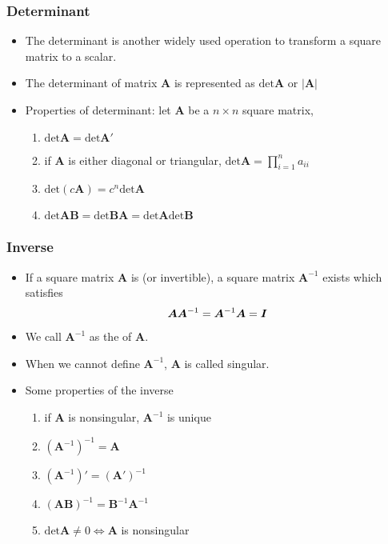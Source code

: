 \documentclass[pdflatex, 12pt]{beamer}
\begin{document}
\begin{frame}
\frametitle{Determinant}
\begin{itemize}
\item The determinant is another widely used operation	 to transform a square matrix to a scalar.
\vspace{0.4cm} 
\item The determinant of matrix $\bm{A}$ is represented as $\mathrm{det}\bm{A}$ or $|\bm{A}|$
\vspace{0.4cm}
\item Properties of determinant: let $\bm{A}$ be a $n \times n$ square matrix,
 \begin{enumerate}
 \item $\mathrm{det} \bm{A} = \mathrm{det} \bm{A}'$
 \item if $\bm{A}$ is either diagonal or triangular, $\mathrm{det} \bm{A} = \prod_{i = 1}^n a_{ii}$
 \item $\mathrm{det} (c\bm{A}) = c^n\mathrm{det} \bm{A}$
 \item $\mathrm{det} \bm{AB} = \mathrm{det} \bm{BA} = \mathrm{det} \bm{A}\mathrm{det} \bm{B}$
 \end{enumerate}
\end{itemize}
\end{frame}

\begin{frame}
\frametitle{Inverse}
\begin{itemize}
\item If a square matrix $\bm{A}$ is {\color{red}{nonsingular}} (or {\color{red}invertible}), a square matrix $\bm{A}^{-1}$ exists which satisfies
 \begin{equation}
 \bm{AA}^{-1} = \bm{A}^{-1}\bm{A} = \bm{I} \notag
 \end{equation}
\item We call $\bm{A}^{-1}$ as the {\color{red}{inverse}} of $\bm{A}$.
\vspace{0.4cm}
\item When we cannot define $\bm{A}^{-1}$, $\bm{A}$ is called singular.
\vspace{0.4cm}
\item Some properties of the inverse
 \begin{enumerate}
 \item if $\bm{A}$ is nonsingular, $\bm{A}^{-1}$ is unique
 \item $(\bm{A}^{-1})^{-1} = \bm{A}$
 \item $(\bm{A}^{-1})' = (\bm{A}')^{-1}$
 \item $(\bm{AB})^{-1} = \bm{B}^{-1}\bm{A}^{-1}$ 
 \item $\mathrm{det} \bm{A} \neq 0 \Leftrightarrow \bm{A}$ is nonsingular
 \end{enumerate}
\end{itemize}
\end{frame}
\end{document}
